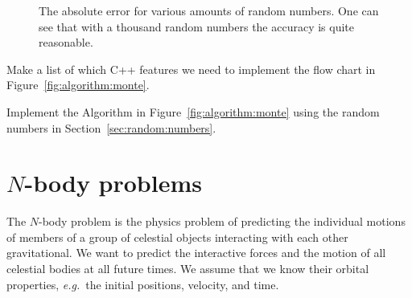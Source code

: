 \begin{figure}[tb]
\centering
{}
\caption{The absolute error for various amounts of random numbers. One can see that with a thousand random numbers the accuracy is quite reasonable. }
\label{fig:monte:carlo}
\end{figure}

\begin{exercise}
Make a list of which C++ features we need to implement the flow chart in Figure~\ref{fig:algorithm:monte}.
\end{exercise}

\begin{exercise}
Implement the Algorithm in Figure~\ref{fig:algorithm:monte} using the random numbers in Section~\ref{sec:random:numbers}.
\end{exercise}


\chapter{$N$-body problems}
\label{sec:nbody}
The $N$-body problem is the physics problem of predicting the individual motions of members of a group of celestial objects interacting with each other gravitational. We want to predict the interactive forces and the motion of all celestial bodies at all future times. We assume that we know their orbital properties, \emph{e.g.}\ the initial positions, velocity, and time.\\

